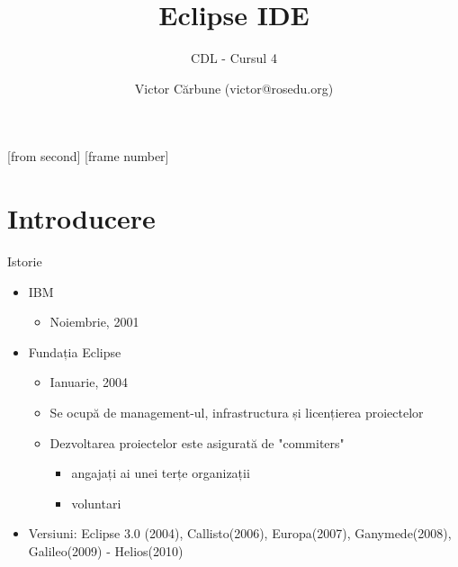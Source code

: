\documentclass{beamer}
\title[Eclipse IDE]{Eclipse IDE}
\subtitle{CDL - Cursul 4}
\institute[ROSEdu]{ROSEdu}
\author[Victor]{Victor Cărbune (\small victor@rosedu.org)}
\begin{document}
[from second]
[frame number]

\frame{\titlepage}

\begin{frame}
\tableofcontents
\end{frame}

\section{Introducere}


\begin{frame}{Istorie}

\begin{itemize}
	\item IBM
 		\begin{itemize}
		\pause	
		\item Noiembrie, 2001
		\end{itemize}
	\pause
	\vspace{4mm} 
	\item Fundația Eclipse
		\begin{itemize}	
		\pause	
		\item Ianuarie, 2004
		\pause
		\item Se ocupă de management-ul, infrastructura și licențierea proiectelor 
		\pause	
		\item Dezvoltarea proiectelor este asigurată de "commiters"
			\begin{itemize}	
			\pause	
			\item angajați ai unei terțe organizații
			\pause	
			\item voluntari
			\end{itemize}
		\end{itemize}
	\vspace{4mm} 
	\pause	
	\item Versiuni: Eclipse 3.0 (2004), Callisto(2006), Europa(2007), Ganymede(2008), Galileo(2009) - Helios(2010)
\end{itemize}
\end{frame}
\end{document}
